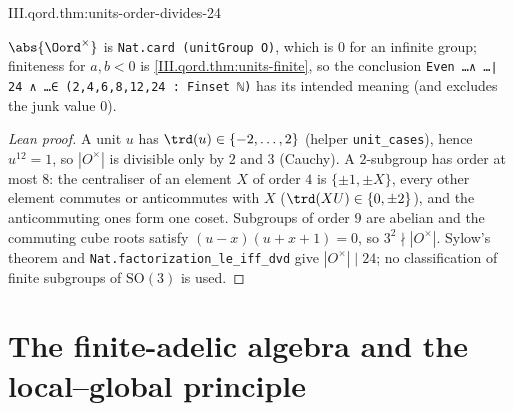 \begin{theorem}
\end{theorem}
\begin{tfformal}{III.qord.thm:units-order-divides-24}
\begin{tffidelity}
$\abs{\Oord^\times}$ is \texttt{Nat.card (unitGroup O)}, which is $0$ for an infinite group; finiteness for $a,b<0$ is \cref{III.qord.thm:units-finite}, so the conclusion \texttt{Even \dots ∧ \dots ∣ 24 ∧ \dots ∈ ({2,4,6,8,12,24} : Finset ℕ)} has its intended meaning (and excludes the junk value $0$).
\end{tffidelity}
\end{tfformal}
\begin{proof}[Lean proof]
A unit $u$ has $\trd(u)\in\{-2,\dots,2\}$ (helper \texttt{unit\_cases}), hence $u^{12}=1$, so $|O^\times|$ is divisible only by $2$ and $3$ (Cauchy). A $2$-subgroup has order at most $8$: the centraliser of an element $X$ of order $4$ is $\{\pm1,\pm X\}$, every other element commutes or anticommutes with $X$ ($\trd(XU)\in\{0,\pm2\}$), and the anticommuting ones form one coset. Subgroups of order $9$ are abelian and the commuting cube roots satisfy $(u-x)(u+x+1)=0$, so $3^2\nmid|O^\times|$. Sylow's theorem and \texttt{Nat.factorization\_le\_iff\_dvd} give $|O^\times|\mid 24$; no classification of finite subgroups of $\mathrm{SO}(3)$ is used.
\end{proof}


\section{The finite-adelic algebra and the local--global principle}\label{sec:qcls-adelic}


